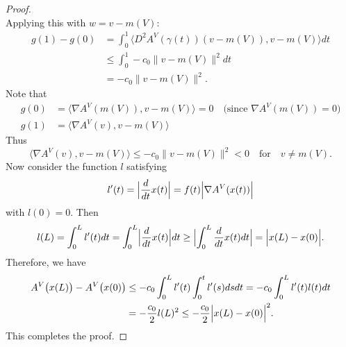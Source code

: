 \documentclass[12pt,english]{article}
\theoremstyle{definition}
\begin{document}
\begin{proof}
\[\]
Applying this with $w = v - m(V)$:
\begin{align*}
g(1) - g(0) 
&= \int_0^1 \langle D^2 A^V(\gamma(t)) (v - m(V)), v - m(V) \rangle  dt \\
&\leq \int_0^1 -c_0 \lVert v - m(V) \rVert^2  dt \\
&= -c_0 \lVert v - m(V) \rVert^2.
\end{align*}
Note that
\begin{align*}
g(0) &= \langle \nabla A^V(m(V)), v - m(V) \rangle = 0 \quad \text{(since $\nabla A^V(m(V)) = 0$)} \\
g(1) &= \langle \nabla A^V(v), v - m(V) \rangle
\end{align*}
Thus
\begin{equation*}
\langle \nabla A^V(v), v - m(V) \rangle \leq -c_0 \lVert v - m(V)\rVert^2 < 0 \quad \text{for} \quad v \neq m(V).
\end{equation*}
Now consider the function $l$ satisfying
\begin{equation*}
    l'(t) = \Bigl|\frac{d}{dt} x(t) \Bigr| = f(t) \Bigl|\nabla A^V(x(t))\Bigr|
\end{equation*}
with $l(0) = 0$. Then
\begin{equation*}
    l(L) = \int^L_0 l'(t) dt = \int^L_0 \Bigl|\frac{d}{dt} x(t) \Bigr| dt \geq \Bigl| \int^L_0 \frac{d}{dt} x(t) dt \Bigr| = \Bigl| x(L) - x(0) \Bigr|.
\end{equation*}
Therefore, we have
\begin{align*}
    A^V\bigl(x(L)\bigr) - A^V\bigl(x(0)\bigr) 
    &\leq -c_0 \int^L_0 l'(t) \int_0^t l'(s) ds dt = -c_0 \int_0^L l'(t) l(t) dt \\ 
    &= - \frac{c_0}{2} l(L)^2 \leq - \frac{c_0}{2} \Bigl| x(L) - x(0) \Bigr|^2.
\end{align*}
This completes the proof.
\end{proof}
\end{document}
